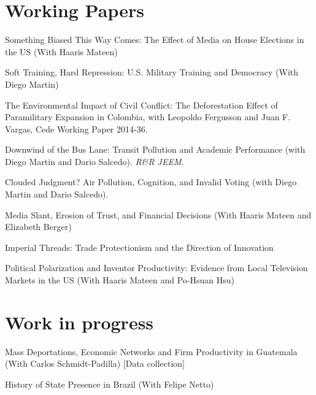 \documentclass{moderncv}
\begin{document}
\section{\textbf{Working Papers}}
{Something Biased This Way Comes: The Effect of Media on House Elections in the US (With Haaris Mateen) \\ }

{Soft Training, Hard Repression: U.S. Military Training and Democracy (With Diego Martin) \\ }

{The Environmental Impact of Civil Conflict: The Deforestation Effect of Paramilitary Expansion in Colombia, with Leopoldo Fergusson and Juan F. Vargas, Cede Working Paper 2014-36.\\}

{Downwind of the Bus Lane: Transit Pollution and Academic Performance (with Diego Martin and Dario Salcedo). \textit{R\&R JEEM.} \\ }

{Clouded Judgment? Air Pollution, Cognition, and Invalid Voting (with Diego Martin and Dario Salcedo). \\ }

{Media Slant, Erosion of Trust, and Financial Decisions (With Haaris Mateen and Elizabeth Berger)  \\ }

{Imperial Threads: Trade Protectionism and the Direction of Innovation \\ }

{Political Polarization and Inventor Productivity: Evidence from Local Television Markets in the US (With Haaris Mateen and Po-Hsuan Hsu) \\ }

\section{\textbf{Work in progress}}

{Mass Deportations, Economic Networks and Firm Productivity in Guatemala (With Carlos Schmidt-Padilla)  [Data collection] \\ }

{History of State Presence in Brazil (With Felipe Netto) \\ }
\end{document}
